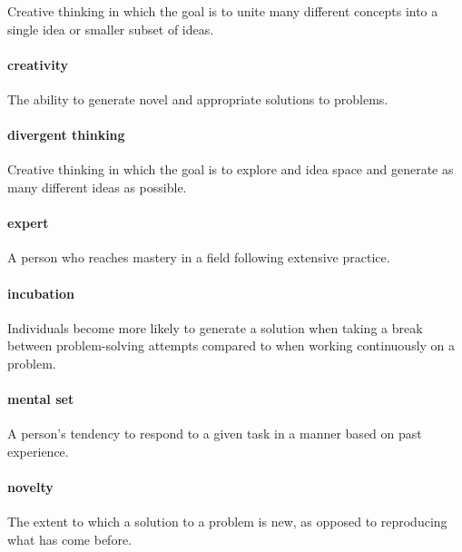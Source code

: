 \documentclass[
]{krantz}
\begin{document}
Creative thinking in which the goal is to unite many different concepts into a single idea or smaller subset of ideas.

\paragraph*{creativity}\label{creativity-1}

The ability to generate novel and appropriate solutions to problems.

\paragraph*{divergent thinking}\label{divergent-thinking}

Creative thinking in which the goal is to explore and idea space and generate as many different ideas as possible.

\paragraph*{expert}\label{expert}

A person who reaches mastery in a field following extensive practice.

\paragraph*{incubation}\label{incubation}

Individuals become more likely to generate a solution when taking a break between problem-solving attempts compared to when working continuously on a problem.

\paragraph*{mental set}\label{mental-set}

A person's tendency to respond to a given task in a manner based on past experience.

\paragraph*{novelty}\label{novelty}

The extent to which a solution to a problem is new, as opposed to reproducing what has come before.
\end{document}
